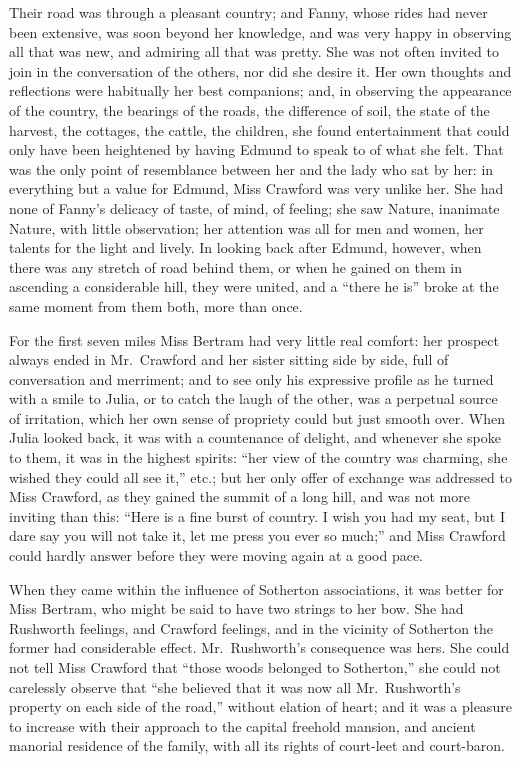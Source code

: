 \documentclass{article}
\begin{document}
Their road was through a pleasant country; and Fanny,
whose rides had never been extensive, was soon beyond
her knowledge, and was very happy in observing all that
was new, and admiring all that was pretty.  She was not
often invited to join in the conversation of the others,
nor did she desire it.  Her own thoughts and reflections
were habitually her best companions; and, in observing
the appearance of the country, the bearings of the roads,
the difference of soil, the state of the harvest, the cottages,
the cattle, the children, she found entertainment
that could only have been heightened by having Edmund
to speak to of what she felt.  That was the only point
of resemblance between her and the lady who sat by her:
in everything but a value for Edmund, Miss Crawford was
very unlike her.  She had none of Fanny's delicacy of taste,
of mind, of feeling; she saw Nature, inanimate Nature,
with little observation; her attention was all for men
and women, her talents for the light and lively.
In looking back after Edmund, however, when there was
any stretch of road behind them, or when he gained on
them in ascending a considerable hill, they were united,
and a ``there he is'' broke at the same moment from them both,
more than once.

For the first seven miles Miss Bertram had very little
real comfort:  her prospect always ended in Mr.\ Crawford
and her sister sitting side by side, full of conversation
and merriment; and to see only his expressive profile
as he turned with a smile to Julia, or to catch the laugh
of the other, was a perpetual source of irritation,
which her own sense of propriety could but just smooth over.
When Julia looked back, it was with a countenance of delight,
and whenever she spoke to them, it was in the highest spirits:
``her view of the country was charming, she wished they
could all see it,'' etc.; but her only offer of exchange
was addressed to Miss Crawford, as they gained the summit
of a long hill, and was not more inviting than this:
``Here is a fine burst of country.  I wish you had my seat,
but I dare say you will not take it, let me press you ever
so much;'' and Miss Crawford could hardly answer before they
were moving again at a good pace.

When they came within the influence of Sotherton associations,
it was better for Miss Bertram, who might be said to have
two strings to her bow.  She had Rushworth feelings,
and Crawford feelings, and in the vicinity of Sotherton
the former had considerable effect.  Mr.\ Rushworth's
consequence was hers.  She could not tell Miss Crawford
that ``those woods belonged to Sotherton,'' she could not
carelessly observe that ``she believed that it was now
all Mr.\ Rushworth's property on each side of the road,''
without elation of heart; and it was a pleasure to increase
with their approach to the capital freehold mansion,
and ancient manorial residence of the family, with all
its rights of court-leet and court-baron.
\end{document}
